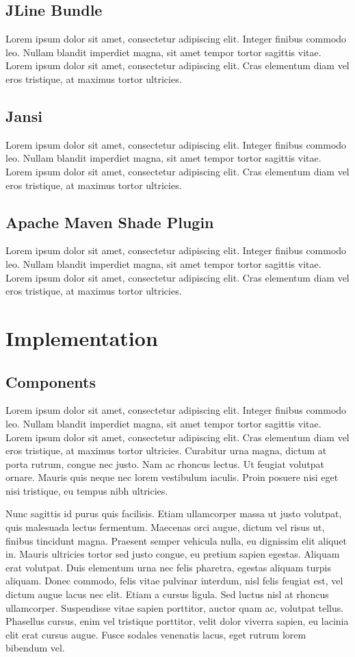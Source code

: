 \documentclass[
  digital,     %
  oneside,     %
  nosansbold,  %
  nocolorbold, %
  lof,         %
  lot,         %
]{fithesis4}
\begin{document}
\section{JLine Bundle}
Lorem ipsum dolor sit amet, consectetur adipiscing elit. Integer finibus commodo leo. Nullam blandit imperdiet magna, sit amet tempor tortor sagittis vitae. Lorem ipsum dolor sit amet, consectetur adipiscing elit. Cras elementum diam vel eros tristique, at maximus tortor ultricies.
\section{Jansi}
Lorem ipsum dolor sit amet, consectetur adipiscing elit. Integer finibus commodo leo. Nullam blandit imperdiet magna, sit amet tempor tortor sagittis vitae. Lorem ipsum dolor sit amet, consectetur adipiscing elit. Cras elementum diam vel eros tristique, at maximus tortor ultricies.
\section{Apache Maven Shade Plugin}
Lorem ipsum dolor sit amet, consectetur adipiscing elit. Integer finibus commodo leo. Nullam blandit imperdiet magna, sit amet tempor tortor sagittis vitae. Lorem ipsum dolor sit amet, consectetur adipiscing elit. Cras elementum diam vel eros tristique, at maximus tortor ultricies.
\shorthandon{-}
\chapter{Implementation}
\section{Components}
Lorem ipsum dolor sit amet, consectetur adipiscing elit. Integer finibus commodo leo. Nullam blandit imperdiet magna, sit amet tempor tortor sagittis vitae. Lorem ipsum dolor sit amet, consectetur adipiscing elit. Cras elementum diam vel eros tristique, at maximus tortor ultricies. Curabitur urna magna, dictum at porta rutrum, congue nec justo. Nam ac rhoncus lectus. Ut feugiat volutpat ornare. Mauris quis neque nec lorem vestibulum iaculis. Proin posuere nisi eget nisi tristique, eu tempus nibh ultricies.

Nunc sagittis id purus quis facilisis. Etiam ullamcorper massa ut justo volutpat, quis malesuada lectus fermentum. Maecenas orci augue, dictum vel risus ut, finibus tincidunt magna. Praesent semper vehicula nulla, eu dignissim elit aliquet in. Mauris ultricies tortor sed justo congue, eu pretium sapien egestas. Aliquam erat volutpat. Duis elementum urna nec felis pharetra, egestas aliquam turpis aliquam. Donec commodo, felis vitae pulvinar interdum, nisl felis feugiat est, vel dictum augue lacus nec elit. Etiam a cursus ligula. Sed luctus nisl at rhoncus ullamcorper. Suspendisse vitae sapien porttitor, auctor quam ac, volutpat tellus. Phasellus cursus, enim vel tristique porttitor, velit dolor viverra sapien, eu lacinia elit erat cursus augue. Fusce sodales venenatis lacus, eget rutrum lorem bibendum vel.
\end{document}
